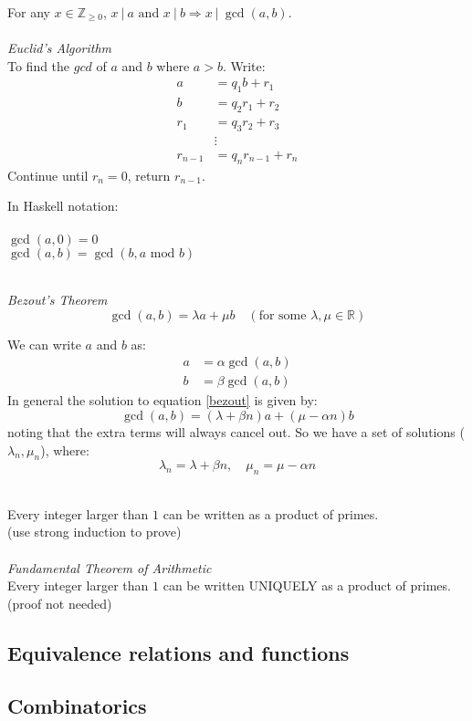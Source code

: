 \documentclass{article}
\newcommand{\R}{\mathbb{R}}
\newcommand{\Z}{\mathbb{Z}}
\begin{document}
For any $ x \in \Z_{\geq 0} $, $ x \ | \ a \textrm{ and } x \ | \ b \Rightarrow x \ | \ \gcd(a, b) $.
\\\\
\textit{Euclid's Algorithm}
\\
To find the $ gcd $ of $ a $ and $ b $ where $ a > b $. Write:
\begin{align}
a & = q_{1} b + r_{1} \\
b & = q_{2} r_{1} + r_{2} \\
r_{1} & = q_{3} r_{2} + r_{3} \\
& \vdots \\
r_{n-1} & = q_{n} r_{n-1} + r_{n}
\end{align}
Continue until $ r_{n} = 0 $, return $ r_{n-1} $.
\\
\begin{tcolorbox}
In Haskell notation:
\\\\
$ \gcd(a, 0) = 0 $
\\
$ \gcd(a, b) = \gcd(b, a \textrm{ mod } b) $
\end{tcolorbox}
\noindent
\\
\textit{Bezout's Theorem}
\begin{equation} \label{bezout}
\gcd(a, b) = \lambda a + \mu b \quad (\textrm{for some } \lambda, \mu \in \R)
\end{equation}
\begin{tcolorbox}
We can write $ a $ and $ b $ as:
\begin{align}
a & = \alpha \gcd(a, b) \\
b & = \beta \gcd(a, b)
\end{align}
In general the solution to equation \ref{bezout} is given by:
\begin{equation}
\gcd(a, b) = (\lambda + \beta n) a + (\mu - \alpha n) b
\end{equation}
noting that the extra terms will always cancel out. So we have a set of solutions ($ \lambda_{n}, \mu_{n} $), where:
\begin{equation}
\lambda_{n} = \lambda + \beta n, \quad \mu_{n} = \mu - \alpha n
\end{equation}
\end{tcolorbox}
\noindent
\\
Every integer larger than $ 1 $ can be written as a product of primes.
\\
(use strong induction to prove)
\\\\
\textit{Fundamental Theorem of Arithmetic}
\\
Every integer larger than $ 1 $ can be written UNIQUELY as a product of primes. (proof not needed)
\subsection{Equivalence relations and functions}
\subsection{Combinatorics}
\end{document}
